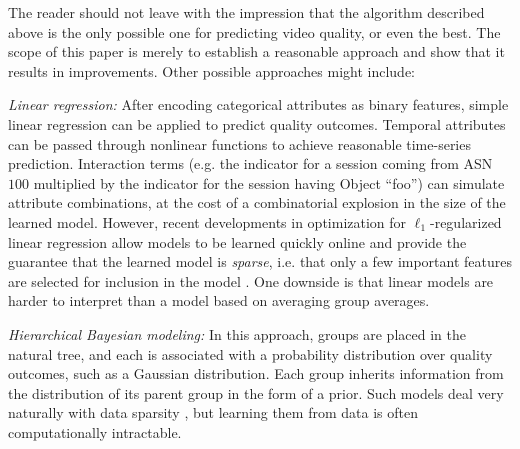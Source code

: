 The reader should not leave with the impression that the algorithm described above is the only possible one for predicting video quality, or even the best.  The scope of this paper is merely to establish a reasonable approach and show that it results in improvements.  Other possible approaches might include:
\begin{packedenumerate}
  \item \emph{Linear regression:} After encoding categorical attributes as binary features, simple linear regression can be applied to predict quality outcomes.  Temporal attributes can be passed through nonlinear functions to achieve reasonable time-series prediction.  Interaction terms (e.g. the indicator for a session coming from ASN $100$ multiplied by the indicator for the session having Object ``foo'') can simulate attribute combinations, at the cost of a combinatorial explosion in the size of the learned model.  However, recent developments in optimization for $\ell_1$-regularized linear regression allow models to be learned quickly online and provide the guarantee that the learned model is \emph{sparse}, i.e. that only a few important features are selected for inclusion in the model \cite{duchi2010composite}.  One downside is that linear models are harder to interpret than a model based on averaging group averages.
  \item \emph{Hierarchical Bayesian modeling:} In this approach, groups are placed in the natural tree, and each is associated with a probability distribution over quality outcomes, such as a Gaussian distribution.  Each group inherits information from the distribution of its parent group in the form of a prior.  Such models deal very naturally with data sparsity \cite{gelman2003bayesian}, but learning them from data is often computationally intractable.
\end{packedenumerate}